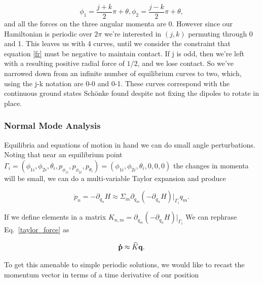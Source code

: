 \documentclass[prbg,preprint]{revtex4-1}
\newcommand{\cvec}[1]{{\rm{\bf{#1}}}}
\begin{document}
\begin{subequations}
	\begin{equation}
		\phi_1 = \frac{j+k}{2}\pi +\theta,
	\end{equation}
	\begin{equation}
		\phi_2 = \frac{j-k}{2}\pi +\theta,
	\end{equation}
\end{subequations}
and all the forces on the three angular momenta are 0. However since our Hamiltonian is periodic over $2\pi$ we're interested in $(j,k)$ permuting through 0 and 1. This leaves us with 4 curves, until we consider the constraint that equation \ref{fr} must be negative to maintain contact. If j is odd, then we're left with a resulting positive radial force of $1/2$, and we lose contact. So we've narrowed down from an infinite number of equilibrium curves to two, which, using the j-k notation are 0-0 and 0-1. These curves correspond with the continuous ground states Schönke \cite{PhysRevApplied.4.064007} found despite not fixing the dipoles to rotate in place.



\subsubsection{Normal Mode Analysis}
Equilibria and equations of motion in hand we can do small angle perturbations. Noting that near an equilibrium point 
$\Gamma_i = 
(
\phi_{1i},\phi_{2i},\theta_{i},
p_{\phi_{1i}},p_{\phi_{2i}},p_{\theta_{i}}
)
=
(\phi_{1i},\phi_{2i},\theta_{i},0,0,0)
$ 
the changes in momenta will be small, we can do a multi-variable Taylor expansion and produce 

\begin{equation}\label{taylor_force}
	\dot p_n 
	=
	-\partial_{q_n}H
	\approx 
	\Sigma_m \partial_{q_m}(-\partial_{q_n} H)|_{\Gamma_i} q_m .
\end{equation}

If we define elements in a matrix 
$K_{n,m}= \partial_{q_m}(-\partial_{q_n} H)|_{\Gamma_i}$
We can rephrase Eq.~\ref{taylor_force} as 

\begin{equation} \label{matrix_force}
	\cvec{ \dot{ p }} \approx \widehat K \cvec q.
\end{equation}

To get this amenable to simple periodic solutions, we would like to recast the momentum vector in terms of a time derivative of our position
\end{document}
